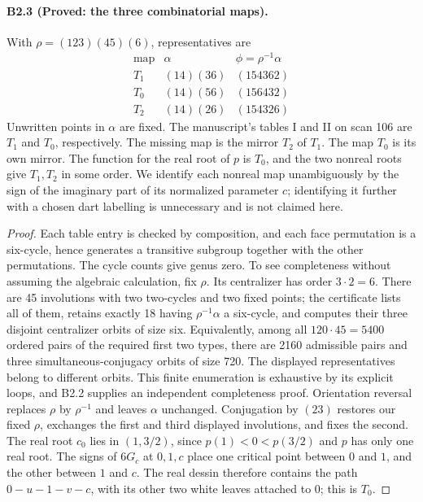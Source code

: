 \paragraph{B2.3 (Proved: the three combinatorial maps).}
With $\rho=(123)(45)(6)$, representatives are
\[
 \begin{array}{c|c|c}
 \text{map}&\alpha&\phi=\rho^{-1}\alpha\\\hline
 T_1&(14)(36)&(154362)\\
 T_0&(14)(56)&(156432)\\
 T_2&(14)(26)&(154326)
 \end{array}
\]
Unwritten points in $\alpha$ are fixed. The manuscript's tables I and II
on scan 106 are $T_1$ and $T_0$, respectively. The missing map is
the mirror $T_2$ of $T_1$. The map $T_0$ is its own mirror.
The function for the real root of $p$ is $T_0$, and the two nonreal
roots give $T_1,T_2$ in some order. We identify each nonreal map
unambiguously by the sign of the imaginary part of its normalized
parameter $c$; identifying it further with a chosen dart labelling is
unnecessary and is not claimed here.

\begin{proof}
Each table entry is checked by composition, and each face permutation
is a six-cycle, hence generates a transitive subgroup together with the
other permutations. The cycle counts give genus zero. To see
completeness without assuming the algebraic calculation, fix $\rho$.
Its centralizer has order $3\cdot2=6$. There are 45 involutions with
two two-cycles and two fixed points; the certificate lists all of them,
retains exactly 18 having $\rho^{-1}\alpha$ a six-cycle, and computes
their three disjoint centralizer orbits of size six. Equivalently, among
all $120\cdot45=5400$ ordered pairs of the required first two types,
there are 2160 admissible pairs and three simultaneous-conjugacy
orbits of size 720. The displayed representatives belong to different
orbits. This finite enumeration is exhaustive by its explicit loops,
and B2.2 supplies an independent completeness proof.
Orientation reversal replaces $\rho$ by $\rho^{-1}$ and leaves
$\alpha$ unchanged. Conjugation by $(23)$ restores our fixed $\rho$,
exchanges the first and third displayed involutions, and fixes the
second. The real root $c_0$ lies in $(1,3/2)$, since $p(1)<0<p(3/2)$
and $p$ has only one real root. The signs of $6G_c$ at $0,1,c$
place one critical point between $0$ and $1$, and the other between
$1$ and $c$. The real dessin therefore contains the path
$0-u-1-v-c$, with its other two white leaves attached to $0$;
this is $T_0$.
\end{proof}

